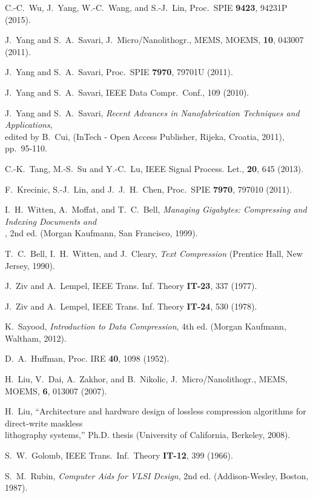 \documentclass{article}
\begin{document}
\noindent C.-C.~Wu, J.~Yang, W.-C.~Wang, and S.-J.~Lin,
Proc.~SPIE {\bf 9423}, 94231P (2015).

\noindent J.~Yang and S.~A.~Savari, 
J.~Micro/Nanolithogr., MEMS, MOEMS, {\bf 10}, 043007 (2011).

\noindent J.~Yang and S.~A.~Savari, 
Proc.~SPIE {\bf 7970}, 79701U (2011).

\noindent J.~Yang and S.~A.~Savari, 
IEEE Data Compr.~Conf., 109 (2010).

\noindent J.~Yang and S.~A.~Savari, 
{\em Recent Advances in Nanofabrication Techniques and Applications}, \\
\indent edited by B.~Cui, (InTech - Open Access Publisher, Rijeka, Croatia, 
2011), pp.~95-110.

\noindent C.-K.~Tang, M.-S.~Su and Y.-C.~Lu, 
IEEE Signal Process. Let., {\bf 20}, 645 (2013).

\noindent F.~Krecinic, S.-J.~Lin, and J.~J.~H.~Chen, 
Proc.~SPIE {\bf 7970}, 797010 (2011).

\noindent I.~H.~Witten, A.~Moffat, and T.~C.~Bell, 
{\em Managing Gigabytes: Compressing and Indexing Documents and} \\
, 2nd ed. (Morgan Kaufmann, San Francisco, 1999).

\noindent T.~C.~Bell, I.~H.~Witten, and J.~Cleary, 
{\em Text Compression} (Prentice Hall, New Jersey, 1990).

\noindent J.~Ziv and A.~Lempel,
IEEE Trans. Inf. Theory {\bf IT-23}, 337 (1977).

\noindent J.~Ziv and A.~Lempel,
IEEE Trans. Inf. Theory {\bf IT-24}, 530 (1978).

\noindent K.~Sayood, {\em Introduction to Data Compression},
4th ed. (Morgan Kaufmann, Waltham, 2012).

\noindent D.~A.~Huffman, Proc. IRE {\bf 40}, 1098 (1952).

\noindent H.~Liu, V.~Dai, A.~Zakhor, and B.~Nikolic,
J.~Micro/Nanolithogr., MEMS, MOEMS, {\bf 6}, 013007 (2007).

\noindent H.~Liu, ``Architecture and hardware design of lossless 
compression algorithms for direct-write maskless \\
\indent lithography systems,'' Ph.D. thesis (University of California, 
Berkeley, 2008).

\noindent S.~W.~Golomb, IEEE Trans.~Inf.~Theory {\bf IT-12}, 399
(1966).

\noindent S.~M.~Rubin, \emph{Computer Aids for VLSI Design}, 
2nd ed. (Addison-Wesley, Boston, 1987).
\end{document}
